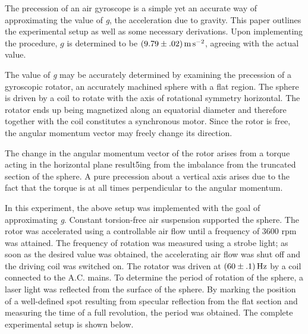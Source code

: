 
\physics

\begin{paperabs}

	The precession of an air gyroscope is a simple yet an accurate way of approximating the value of \textit{g}, the acceleration due to gravity. This paper outlines the experimental setup as well as some necessary derivations. Upon implementing the procedure, \( g \) is determined to be \( \left(9.79 \pm .02\right) \si{\metre\per\second\squared} \), agreeing with the actual value.
	
\end{paperabs}

\begin{paper}
	
	
	The value of \textit{g} may be accurately determined by examining the precession of a gyroscopic rotator, an accurately machined sphere with a flat region. The sphere is driven by a coil to rotate with the axis of rotational symmetry horizontal. The rotator ends up being magnetized along an equatorial diameter and therefore together with the coil constitutes a synchronous motor. Since the rotor is free, the angular momentum vector may freely change its direction. 
	
	The change in the angular momentum vector of the rotor arises from a torque acting in the horizontal plane result5ing from the imbalance from the truncated section of the sphere. A pure precession about a vertical axis arises due to the fact that the torque is at all times perpendicular to the angular momentum. 
	
	In this experiment, the above setup was implemented with the goal of approximating \textit{g}. Constant torsion-free air suspension supported the sphere. The rotor was accelerated using a controllable air flow until a frequency of \( 3600 \) rpm was attained. The frequency of rotation was measured using a strobe light; as soon as the desired value was obtained, the accelerating air flow was shut off and the driving coil was switched on. The rotator was driven at \( \left(60 \pm .1\right) \si{\hertz} \) by a coil connected to the A.C. mains. To determine the period of rotation of the sphere, a laser light was reflected from the surface of the sphere. By marking the position of a well-defined spot resulting from specular reflection from the flat section and measuring the time of a full revolution, the period was obtained. The complete experimental setup is shown below.
	

\end{paper}

